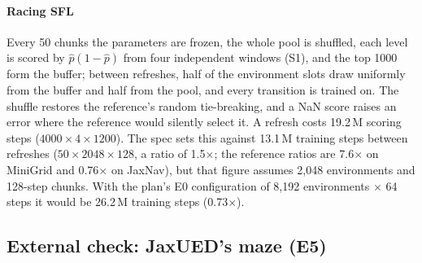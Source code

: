 \paragraph{Racing SFL} Every 50 chunks the parameters are frozen, the whole pool is
shuffled, each level is scored by $\hat p(1-\hat p)$ from four independent windows (S1),
and the top \num{1000} form the buffer; between refreshes, half of the environment slots
draw uniformly from the buffer and half from the pool, and every transition is trained on.
The shuffle restores the reference's random tie-breaking, and a NaN score raises an error
where the reference would silently select it. A refresh costs 19.2\,M scoring steps
($4000 \times 4 \times 1200$). The spec sets this against 13.1\,M training steps between
refreshes ($50 \times 2048 \times 128$, a ratio of 1.5$\times$; the reference ratios are
7.6$\times$ on MiniGrid and 0.76$\times$ on JaxNav), but that figure assumes 2,048
environments and 128-step chunks. With the plan's E0 configuration of 8,192 environments
$\times$ 64 steps it would be 26.2\,M training steps (0.73$\times$).

\subsection{External check: JaxUED's maze (E5)}
\label{sec:protocol-e5}


